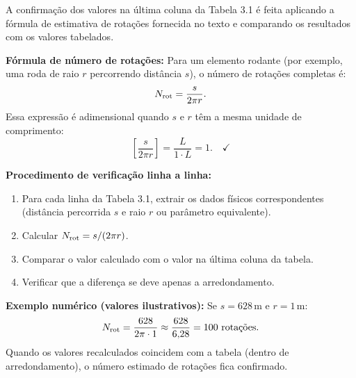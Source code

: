 A confirmação dos valores na última coluna da Tabela 3.1 é feita aplicando a fórmula de estimativa de rotações fornecida no texto e comparando os resultados com os valores tabelados.

\textbf{Fórmula de número de rotações:}
Para um elemento rodante (por exemplo, uma roda de raio $r$ percorrendo distância $s$), o número de rotações completas é:
\[
N_{\rm rot} = \frac{s}{2\pi r}.
\]
Essa expressão é adimensional quando $s$ e $r$ têm a mesma unidade de comprimento:
\[
\left[\frac{s}{2\pi r}\right] = \frac{L}{1 \cdot L} = 1.\quad\checkmark
\]

\textbf{Procedimento de verificação linha a linha:}
\begin{enumerate}
\item Para cada linha da Tabela 3.1, extrair os dados físicos correspondentes (distância percorrida $s$ e raio $r$ ou parâmetro equivalente).
\item Calcular $N_{\rm rot} = s/(2\pi r)$.
\item Comparar o valor calculado com o valor na última coluna da tabela.
\item Verificar que a diferença se deve apenas a arredondamento.
\end{enumerate}

\textbf{Exemplo numérico (valores ilustrativos):}
Se $s = 628\,\mathrm{m}$ e $r = 1\,\mathrm{m}$:
\[
N_{\rm rot} = \frac{628}{2\pi\cdot 1} \approx \frac{628}{6{,}28} = 100\text{ rota\c{c}\~oes}.
\]
Quando os valores recalculados coincidem com a tabela (dentro de arredondamento), o número estimado de rotações fica confirmado.

